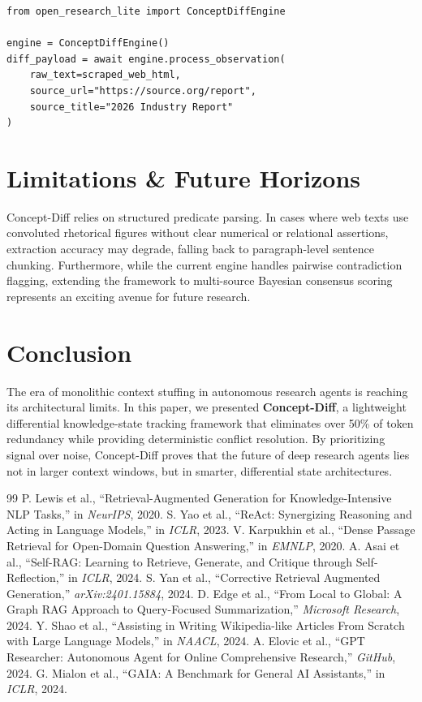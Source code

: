 \documentclass[10pt,twocolumn,letterpaper]{article}
\begin{document}
\begin{small}
\begin{verbatim}
from open_research_lite import ConceptDiffEngine

engine = ConceptDiffEngine()
diff_payload = await engine.process_observation(
    raw_text=scraped_web_html,
    source_url="https://source.org/report",
    source_title="2026 Industry Report"
)
\end{verbatim}
\end{small}

\section{Limitations \& Future Horizons}
Concept-Diff relies on structured predicate parsing. In cases where web texts use convoluted rhetorical figures without clear numerical or relational assertions, extraction accuracy may degrade, falling back to paragraph-level sentence chunking. Furthermore, while the current engine handles pairwise contradiction flagging, extending the framework to multi-source Bayesian consensus scoring represents an exciting avenue for future research.

\section{Conclusion}
The era of monolithic context stuffing in autonomous research agents is reaching its architectural limits. In this paper, we presented \textbf{Concept-Diff}, a lightweight differential knowledge-state tracking framework that eliminates over 50\% of token redundancy while providing deterministic conflict resolution. By prioritizing signal over noise, Concept-Diff proves that the future of deep research agents lies not in larger context windows, but in smarter, differential state architectures.

\begin{thebibliography}{99}
 P. Lewis et al., ``Retrieval-Augmented Generation for Knowledge-Intensive NLP Tasks,'' in \textit{NeurIPS}, 2020.
 S. Yao et al., ``ReAct: Synergizing Reasoning and Acting in Language Models,'' in \textit{ICLR}, 2023.
 V. Karpukhin et al., ``Dense Passage Retrieval for Open-Domain Question Answering,'' in \textit{EMNLP}, 2020.
 A. Asai et al., ``Self-RAG: Learning to Retrieve, Generate, and Critique through Self-Reflection,'' in \textit{ICLR}, 2024.
 S. Yan et al., ``Corrective Retrieval Augmented Generation,'' \textit{arXiv:2401.15884}, 2024.
 D. Edge et al., ``From Local to Global: A Graph RAG Approach to Query-Focused Summarization,'' \textit{Microsoft Research}, 2024.
 Y. Shao et al., ``Assisting in Writing Wikipedia-like Articles From Scratch with Large Language Models,'' in \textit{NAACL}, 2024.
 A. Elovic et al., ``GPT Researcher: Autonomous Agent for Online Comprehensive Research,'' \textit{GitHub}, 2024.
 G. Mialon et al., ``GAIA: A Benchmark for General AI Assistants,'' in \textit{ICLR}, 2024.
\end{thebibliography}
\end{document}
